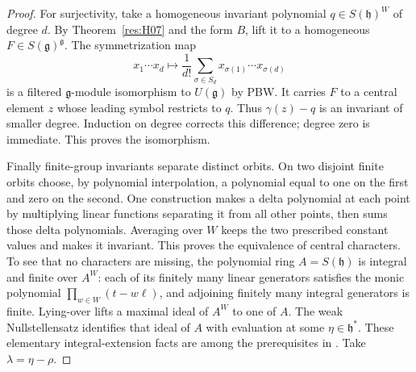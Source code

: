 \begin{proof}
For surjectivity, take a homogeneous invariant polynomial
\(q\in S(\mathfrak h)^W\) of degree \(d\).
By Theorem~\ref{res:H07} and the form \(B\), lift it to a
homogeneous \(F\in S(\mathfrak g)^{\mathfrak g}\).
The symmetrization map
\[
 x_1\cdots x_d\longmapsto
       \frac1{d!}\sum_{\sigma\in S_d}x_{\sigma(1)}\cdots x_{\sigma(d)}
\]
is a filtered \(\mathfrak g\)-module isomorphism to
\(U(\mathfrak g)\) by PBW.
It carries \(F\) to a central element \(z\) whose leading
symbol restricts to \(q\). Thus \(\gamma(z)-q\) is an invariant
of smaller degree. Induction on degree corrects this difference;
degree zero is immediate. This proves the isomorphism.

Finally finite-group invariants separate distinct orbits.
On two disjoint finite orbits choose, by polynomial interpolation,
a polynomial equal to one on the first and zero on the second.
One construction makes a delta polynomial at each point by
multiplying linear functions separating it from all other points,
then sums those delta polynomials. Averaging over \(W\) keeps
the two prescribed constant values and makes it invariant.
This proves the equivalence of central characters.
To see that no characters are missing, the polynomial ring
\(A=S(\mathfrak h)\) is integral and finite over \(A^W\):
each of its finitely many linear generators satisfies the monic
polynomial \(\prod_{w\in W}(t-w\ell)\), and adjoining finitely
many integral generators is finite.
Lying-over lifts a maximal ideal of \(A^W\) to one of \(A\).
The weak Nullstellensatz identifies that ideal of \(A\) with
evaluation at some \(\eta\in\mathfrak h^*\).
These elementary integral-extension facts are among the
prerequisites in \cite[Chapter 4]{p103}.
Take \(\lambda=\eta-\rho\).
\end{proof}

